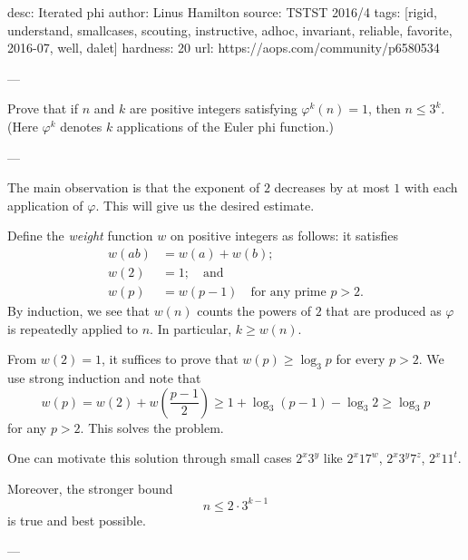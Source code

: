 desc:  Iterated phi
author: Linus Hamilton
source:  TSTST 2016/4
tags:  [rigid, understand, smallcases, scouting, instructive, adhoc, invariant, reliable, favorite, 2016-07, well, dalet]
hardness: 20
url: https://aops.com/community/p6580534

---

Prove that if $n$ and $k$ are positive integers
satisfying $\varphi^k(n) = 1$, then $n \le 3^k$.
(Here $\varphi^k$ denotes $k$ applications of the Euler phi function.)

---

The main observation is that the exponent of $2$ decreases
by at most $1$ with each application of $\varphi$.
This will give us the desired estimate.

Define the \emph{weight} function $w$ on positive integers as follows:
it satisfies
\begin{align*}
  w(ab) &= w(a)+w(b); \\
  w(2) &= 1; \quad\text{and} \\
  w(p) &= w(p-1) \quad \text{for any prime $p > 2$}.
\end{align*}
By induction, we see that $w(n)$ counts the powers of $2$
that are produced as $\varphi$ is repeatedly applied to $n$.
In particular, $k \ge w(n)$.

From $w(2) = 1$,
it suffices to prove that $w(p) \ge \log_3 p$ for every $p > 2$.
We use strong induction and note that
\[
 w(p) = w(2) + w\left( \frac{p-1}{2} \right)
 \ge 1 + \log_3(p-1) - \log_3 2 \ge \log_3 p
\]
for any $p > 2$.
This solves the problem.

\begin{remark*}
One can motivate this solution through small cases $2^x 3^y$
like $2^x 17^w$, $2^x 3^y 7^z$, $2^x 11^t$.

Moreover, the stronger bound \[ n \le 2 \cdot 3^{k-1} \]
is true and best possible.
\end{remark*}

---

